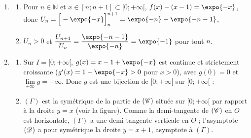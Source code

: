 \begin{enumerate}
\begin{enumerate}
      \end{enumerate}
   \item
      \begin{enumerate}
         \item {}
            Pour $n \in \mathbb{N}$ et $x \in [n ; n+1] \subset [0 ; +\infty[$, $f(x) - (x - 1) = \expo{-x}$, donc
            $U_n = \Big[-\expo{-x}\Big]_n^{n+1} = \expo{-n} - \expo{-n-1}$, 
         \item {}
            $U_n > 0$ et $\dfrac{U_{n+1}}{U_n} = \dfrac{\expo{-n-1}}{\expo{-n}} = \expo{-1}$ pour tout $n$.
            \par\noindent{}
      \end{enumerate}
   \item
      \begin{enumerate}
         \item {}
            Sur $I = [0 ; +\infty[$, $g(x) = x - 1 + \expo{-x}$ est continue et strictement croissante ($g'(x) = 1 - \expo{-x} > 0$ pour $x > 0$),
            avec $g(0) = 0$ et $\lim\limits_{+\infty} g = +\infty$. Donc $g$ est une bijection de $[0 ; +\infty[$ sur $[0 ; +\infty[$ :
            \par\noindent\ansbox{$g$ admet une fonction r\'eciproque $g^{-1} : [0 ; +\infty[ \to [0 ; +\infty[$.}
         \item {}
            $(\Gamma)$ est la sym\'etrique de la partie de $(\mathscr{C})$ situ\'ee sur $[0 ; +\infty[$ par rapport \`a la droite $y = x$
            (voir la figure). Comme la demi-tangente de $(\mathscr{C})$ en $O$ est horizontale, $(\Gamma)$ a une demi-tangente verticale en $O$ ;
            l'asymptote $(\mathscr{D})$ a pour sym\'etrique la droite $y = x + 1$, asymptote \`a $(\Gamma)$.
      \end{enumerate}
\end{enumerate}
